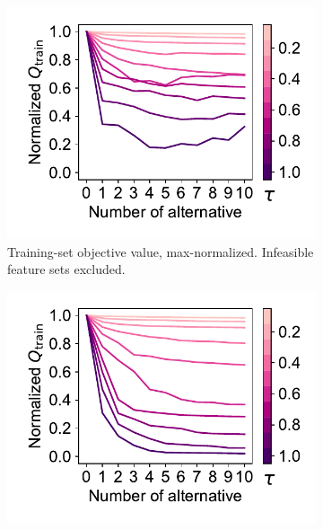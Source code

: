 \documentclass{article}
\theoremstyle{definition}
\begin{document}
\begin{figure}[p]
	\centering
	\begin{subfigure}[t]{0.48\textwidth}
		\centering
		\includegraphics[width=\textwidth, trim=15 15 10 15, clip]{plots/impact-num-alternatives-tau-train-objective-max.pdf}
		\caption{
			Training-set objective value, max-normalized.
			Infeasible feature sets excluded.
		}
		\label{fig:afs:impact-num-alternatives-tau-train-objective-max}
	\end{subfigure}
	\hfill
	\begin{subfigure}[t]{0.48\textwidth}
		\centering
		\includegraphics[width=\textwidth, trim=15 15 10 15, clip]{plots/impact-num-alternatives-tau-train-objective-max-fillna.pdf}
		\caption{
}
\end{subfigure}
\end{figure}
\end{document}
